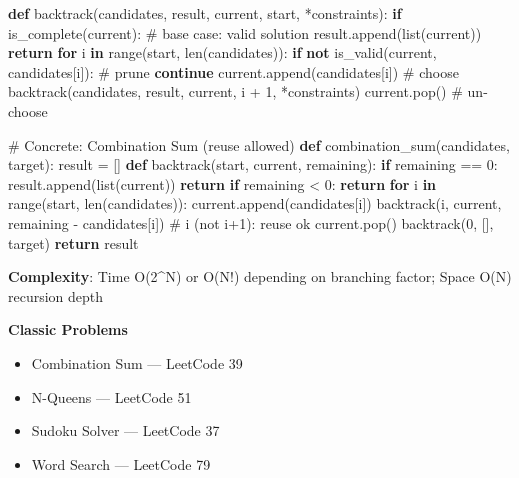 \documentclass[11pt]{article}
\providecommand{\tightlist}{\setlength{\itemsep}{1pt}\setlength{\parskip}{0pt}}
\newenvironment{Shaded}{\begin{snugshade}}{\end{snugshade}}
\newcommand{\BuiltInTok}[1]{\textcolor[rgb]{0.50,0.55,0.55}{#1}}
\newcommand{\CommentTok}[1]{\textcolor[rgb]{0.48,0.49,0.49}{#1}}
\newcommand{\ControlFlowTok}[1]{\textcolor[rgb]{0.99,0.74,0.29}{\textbf{#1}}}
\newcommand{\DecValTok}[1]{\textcolor[rgb]{0.96,0.45,0.00}{#1}}
\newcommand{\KeywordTok}[1]{\textcolor[rgb]{0.81,0.81,0.76}{\textbf{#1}}}
\newcommand{\NormalTok}[1]{\textcolor[rgb]{0.81,0.81,0.76}{#1}}
\newcommand{\OperatorTok}[1]{\textcolor[rgb]{0.81,0.81,0.76}{#1}}
\begin{document}
\begin{Shaded}
\begin{Highlighting}[]
\KeywordTok{def}\NormalTok{ backtrack(candidates, result, current, start, }\OperatorTok{*}\NormalTok{constraints):}
    \ControlFlowTok{if}\NormalTok{ is\_complete(current):        }\CommentTok{\# base case: valid solution}
\NormalTok{        result.append(}\BuiltInTok{list}\NormalTok{(current))}
        \ControlFlowTok{return}
    \ControlFlowTok{for}\NormalTok{ i }\KeywordTok{in} \BuiltInTok{range}\NormalTok{(start, }\BuiltInTok{len}\NormalTok{(candidates)):}
        \ControlFlowTok{if} \KeywordTok{not}\NormalTok{ is\_valid(current, candidates[i]):  }\CommentTok{\# prune}
            \ControlFlowTok{continue}
\NormalTok{        current.append(candidates[i])             }\CommentTok{\# choose}
\NormalTok{        backtrack(candidates, result, current, i }\OperatorTok{+} \DecValTok{1}\NormalTok{, }\OperatorTok{*}\NormalTok{constraints)}
\NormalTok{        current.pop()                             }\CommentTok{\# un{-}choose}

\CommentTok{\# Concrete: Combination Sum (reuse allowed)}
\KeywordTok{def}\NormalTok{ combination\_sum(candidates, target):}
\NormalTok{    result }\OperatorTok{=}\NormalTok{ []}
    \KeywordTok{def}\NormalTok{ backtrack(start, current, remaining):}
        \ControlFlowTok{if}\NormalTok{ remaining }\OperatorTok{==} \DecValTok{0}\NormalTok{:}
\NormalTok{            result.append(}\BuiltInTok{list}\NormalTok{(current))}
            \ControlFlowTok{return}
        \ControlFlowTok{if}\NormalTok{ remaining }\OperatorTok{\textless{}} \DecValTok{0}\NormalTok{:}
            \ControlFlowTok{return}
        \ControlFlowTok{for}\NormalTok{ i }\KeywordTok{in} \BuiltInTok{range}\NormalTok{(start, }\BuiltInTok{len}\NormalTok{(candidates)):}
\NormalTok{            current.append(candidates[i])}
\NormalTok{            backtrack(i, current, remaining }\OperatorTok{{-}}\NormalTok{ candidates[i])  }\CommentTok{\# i (not i+1): reuse ok}
\NormalTok{            current.pop()}
\NormalTok{    backtrack(}\DecValTok{0}\NormalTok{, [], target)}
    \ControlFlowTok{return}\NormalTok{ result}
\end{Highlighting}
\end{Shaded}

\textbf{Complexity}: Time O(2\^{}N) or O(N!) depending on branching factor; Space O(N) recursion depth

\textbf{Classic Problems}

\begin{itemize}
\tightlist
\item
  Combination Sum --- LeetCode 39
\item
  N-Queens --- LeetCode 51
\item
  Sudoku Solver --- LeetCode 37
\item
  Word Search --- LeetCode 79
\end{itemize}
\end{document}
